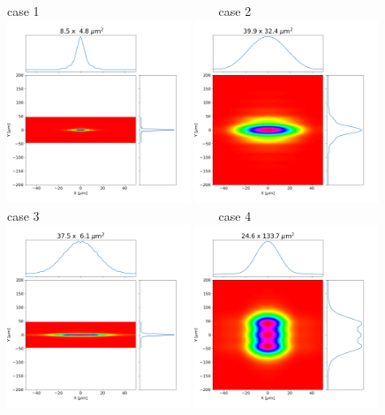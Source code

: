 \documentclass[]{article}
\begin{document}
  

\thispagestyle{empty}


\begin{figure}
    \centering
    case 1~~~~~~~~~~~~~~~~~~~~~~~~~~~~~case 2\\
    \includegraphics[width=0.49\textwidth]{figures/case1_wofry_ws_results.png}
    \includegraphics[width=0.49\textwidth]{figures/case2_wofry_ws_results.png}\\
    case 3~~~~~~~~~~~~~~~~~~~~~~~~~~~~~case 4\\
    \includegraphics[width=0.49\textwidth]{figures/case3_wofry_ws_results.png}
    \includegraphics[width=0.49\textwidth]{figures/case4_wofry_ws_results.png}

\end{figure}
\end{document}
